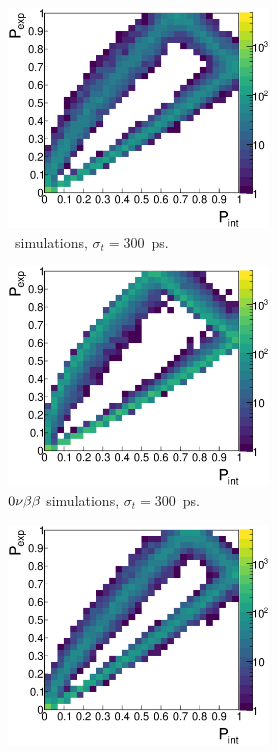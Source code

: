 \begin{figure}[!h]
\begin{subfigure}[t]{0.49\textwidth}
  \centering
  \includegraphics[width=0.76\textwidth]{timedifference/fig_timediff/PintVSPexp_208Tl_300.eps}
  \captionsetup{justification=justified}
  \caption{\Tl\ simulations, ${\sigma_{t}=300}$~ps.
    \label{subfig:}}
\end{subfigure}
\hfill
\begin{subfigure}[t]{0.49\textwidth}
  \centering
  \includegraphics[width=0.76\textwidth]{timedifference/fig_timediff/PintVSPexp_0nubb_300.eps}
  \captionsetup{justification=justified}
  \caption{$0\nu\beta\beta$ simulations, ${\sigma_{t}=300}$~ps.
    \label{subfig:}}
\end{subfigure}
\begin{subfigure}[t]{0.49\textwidth}
  \centering
  \includegraphics[width=0.76\textwidth]{timedifference/fig_timediff/PintVSPexp_208Tl_400.eps}

\end{subfigure}
\end{figure}

